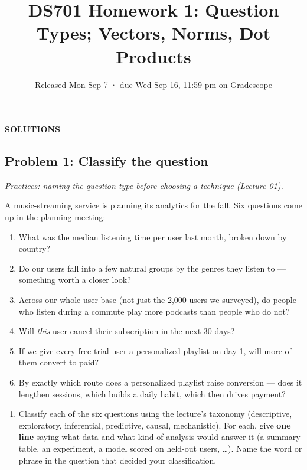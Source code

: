 \documentclass[
  11pt,
]{article}
\title{DS701 Homework 1: Question Types; Vectors, Norms, Dot Products}
\subtitle{Released Mon Sep 7 · due Wed Sep 16, 11:59 pm on Gradescope}
\author{}
\date{}
\providecommand{\tightlist}{%
  \setlength{\itemsep}{0pt}\setlength{\parskip}{0pt}}
\newcommand{\answerspace}[1]{\par\vspace*{#1}}  %
\newcommand{\answerpage}{\clearpage}
\begin{document}
\maketitle


\begin{center}\LARGE\bfseries\color{blue!45!black} SOLUTIONS\end{center}
\renewcommand{\answerspace}[1]{}
\renewcommand{\answerpage}{\par\vspace{6pt}}

\subsection{Problem 1: Classify the
question}\label{problem-1-classify-the-question}

\emph{Practices: naming the question type before choosing a technique
(Lecture 01).}

A music-streaming service is planning its analytics for the fall. Six
questions come up in the planning meeting:

\begin{enumerate}
\def\labelenumi{\arabic{enumi}.}
\tightlist
\item
  What was the median listening time per user last month, broken down by
  country?
\item
  Do our users fall into a few natural groups by the genres they listen
  to --- something worth a closer look?
\item
  Across our whole user base (not just the 2,000 users we surveyed), do
  people who listen during a commute play more podcasts than people who
  do not?
\item
  Will \emph{this} user cancel their subscription in the next 30 days?
\item
  If we give every free-trial user a personalized playlist on day 1,
  will more of them convert to paid?
\item
  By exactly which route does a personalized playlist raise conversion
  --- does it lengthen sessions, which builds a daily habit, which then
  drives payment?
\end{enumerate}

\begin{enumerate}
\def\labelenumi{(\alph{enumi})}
\tightlist
\item
  Classify each of the six questions using the lecture's taxonomy
  (descriptive, exploratory, inferential, predictive, causal,
  mechanistic). For each, give \textbf{one line} saying what data and
  what kind of analysis would answer it (a summary table, an experiment,
  a model scored on held-out users, \ldots). Name the word or phrase in
  the question that decided your classification.
\end{enumerate}
\end{document}
